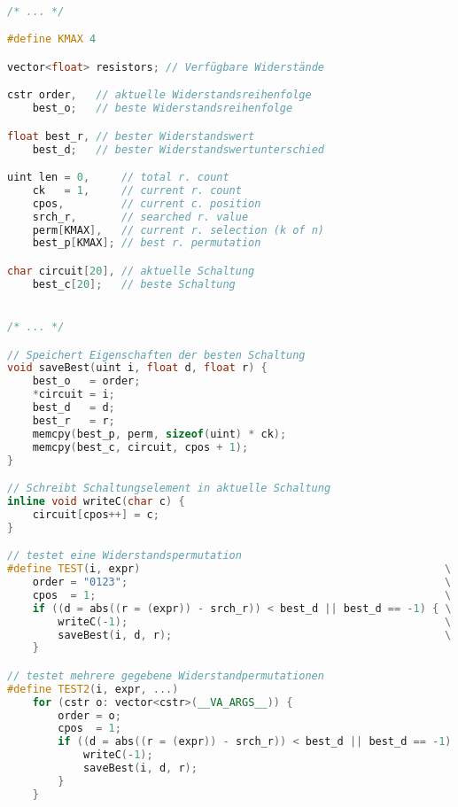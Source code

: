 \documentclass[a4paper,10pt,ngerman]{scrartcl}
\begin{document}
\begin{lstlisting}[language=C++]

/* ... */

#define KMAX 4

vector<float> resistors; // Verfügbare Widerstände

cstr order,   // aktuelle Widerstandsreihenfolge
    best_o;   // beste Widerstandsreihenfolge

float best_r, // bester Widerstandswert
    best_d;   // bester Widerstandswertunterschied

uint len = 0,     // total r. count
    ck   = 1,     // current r. count
    cpos,         // current c. position
    srch_r,       // searched r. value
    perm[KMAX],   // current r. selection (k of n)
    best_p[KMAX]; // best r. permutation

char circuit[20], // aktuelle Schaltung
    best_c[20];   // beste Schaltung


/* ... */

// Speichert Eigenschaften der besten Schaltung
void saveBest(uint i, float d, float r) {
    best_o   = order;
    *circuit = i;
    best_d   = d;
    best_r   = r;
    memcpy(best_p, perm, sizeof(uint) * ck);
    memcpy(best_c, circuit, cpos + 1);
}

// Schreibt Schaltungselement in aktuelle Schaltung
inline void writeC(char c) {
    circuit[cpos++] = c;
}

// testet eine Widerstandspermutation
#define TEST(i, expr)                                                \
    order = "0123";                                                  \
    cpos  = 1;                                                       \
    if ((d = abs((r = (expr)) - srch_r)) < best_d || best_d == -1) { \
        writeC(-1);                                                  \
        saveBest(i, d, r);                                           \
    }

// testet mehrere gegebene Widerstandpermutationen
#define TEST2(i, expr, ...)                                              \
    for (cstr o: vector<cstr>(__VA_ARGS__)) {                            \
        order = o;                                                       \
        cpos  = 1;                                                       \
        if ((d = abs((r = (expr)) - srch_r)) < best_d || best_d == -1) { \
            writeC(-1);                                                  \
            saveBest(i, d, r);                                           \
        }                                                                \
    }


\end{lstlisting}
\end{document}

